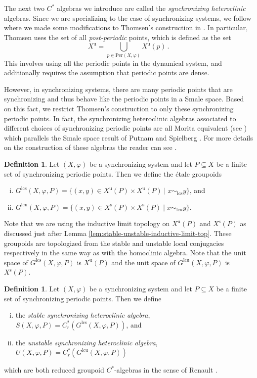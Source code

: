 \documentclass{amsart}
\newcommand{\Per}{\text{Per}}
\newcommand{\lcu}{\text{lcu}}
\newcommand{\lcs}{\text{lcs}}
\theoremstyle{plain}
\theoremstyle{definition}
\newtheorem{definition}[theorem]{Definition}
\theoremstyle{remark}
\begin{document}
The next two $C^\ast$ algebras we introduce are called the \emph{synchronizing heteroclinic} algebras. Since we are specializing to the case of synchronizing systems, we follow \cite{DeeSto} where we made some modifications to Thomsen's construction in \cite{thomsen2010c}.  In particular, Thomsen uses the set of all \emph{post-periodic} points, which is defined as the set \[ X^\text{u} = \bigcup_{p \in \Per(X,\varphi)} X^\text{u}(p) \,. \]  This involves using all the periodic points in the dynamical system, and additionally requires the assumption that periodic points are dense.

However, in synchronizing systems, there are many periodic points that are synchronizing and thus behave like the periodic points in a Smale space. Based on this fact, we restrict Thomsen's construction to only these synchronizing periodic points.  In fact, the synchronizing heteroclinic algebras associated to different choices of synchronizing periodic points are all Morita equivalent (see \cite{DeeSto}) which parallels the Smale space result of Putnam and Spielberg \cite{putnam99}. For more details on the construction of these algebras the reader can see \cite{DeeSto}.

\begin{definition}
Let $(X,\varphi)$ be a synchronizing system and let $P \subseteq X$ be a finite set of synchronizing periodic points.  Then we define the \'{e}tale groupoids
\begin{enumerate}[(i)]
    \item $G^\lcs(X, \varphi, P) = \{ (x, y) \in X^\text{u}(P) \times X^\text{u}(P) \mid x \sim_\lcs y \}$, and
    \item $G^\lcu(X, \varphi, P) = \{ (x, y) \in X^\text{s}(P) \times X^\text{s}(P) \mid x \sim_\lcu y \}$.
\end{enumerate}
Note that we are using the inductive limit topology on $X^\text{u}(P)$ and $X^\text{s}(P)$ as discussed just after Lemma \ref{lem:stable-unstable-inductive-limit-top}. These groupoids are topologized from the stable and unstable local conjugacies respectively in the same way as with the homoclinic algebra.  Note that the unit space of $G^\lcs(X, \varphi, P)$ is $X^\text{u}(P)$ and the unit space of $G^\lcu(X, \varphi, P)$ is $X^\text{s}(P)$.
\end{definition}


\begin{definition}
Let $(X,\varphi)$ be a synchronizing system and let $P \subseteq X$ be a finite set of synchronizing periodic points.  Then we define
\begin{enumerate}[(i)]
    \item the \emph{stable synchronizing heteroclinic algebra}, $S(X,\varphi,P) = C^\ast_r(G^\lcs(X, \varphi, P))$, and
    \item the \emph{unstable synchronizing heteroclinic algebra}, $U(X,\varphi,P) = C^\ast_r(G^\lcu(X, \varphi, P))$
\end{enumerate}
which are both reduced groupoid $C^\ast$-algebras in the sense of Renault \cite{renault1980groupoid}.
\end{definition}
\end{document}
